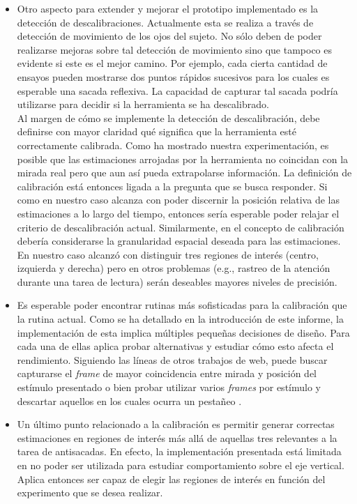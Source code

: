 \begin{itemize}
  \item Otro aspecto para extender y mejorar el prototipo implementado es la
detección de descalibraciones.
  Actualmente esta se realiza a través de detección de movimiento de los ojos
del sujeto.
  No sólo deben de poder realizarse mejoras sobre tal detección de movimiento
sino que tampoco es evidente si este es el mejor camino.
  Por ejemplo, cada cierta cantidad de ensayos pueden mostrarse dos puntos
rápidos sucesivos para los cuales es esperable una sacada reflexiva.
  La capacidad de capturar tal sacada podría utilizarse para decidir si la
herramienta se ha descalibrado. \\
  Al margen de cómo se implemente la detección de descalibración, debe
definirse con mayor claridad qué significa que la herramienta esté
correctamente calibrada.
  Como ha mostrado nuestra experimentación, es posible que las estimaciones
arrojadas por la herramienta no coincidan con la mirada real pero que aun así
pueda extrapolarse información.
  La definición de calibración está entonces ligada a la pregunta que se busca
responder.
  Si como en nuestro caso alcanza con poder discernir la posición relativa de
las estimaciones a lo largo del tiempo, entonces sería esperable poder relajar
el criterio de descalibración actual.
  Similarmente, en el concepto de calibración debería considerarse la
granularidad espacial deseada para las estimaciones.
  En nuestro caso alcanzó con distinguir tres regiones de interés (centro,
izquierda y derecha) pero en otros problemas (e.g., rastreo de la atención
durante una tarea de lectura) serán deseables mayores niveles de precisión.

  \item Es esperable poder encontrar rutinas más sofisticadas para la
calibración que la rutina actual.
  Como se ha detallado en la introducción de este informe, la implementación de
esta implica múltiples pequeñas decisiones de diseño.
  Para cada una de ellas aplica probar alternativas y estudiar cómo esto afecta
el rendimiento.
  Siguiendo las líneas de otros trabajos de \eyetracking web, puede buscar
capturarse el \textit{frame} de mayor coincidencia entre mirada y posición del
estímulo presentado \cite{huang_2016_pace} o bien probar utilizar varios
\textit{frames} por estímulo y descartar aquellos en los cuales ocurra un
pestañeo \cite{xu_2015_turker_gaze}. 

  \item Un último punto relacionado a la calibración es permitir generar
correctas estimaciones en regiones de interés más allá de aquellas tres
relevantes a la tarea de antisacadas.
  En efecto, la implementación presentada está limitada en no poder ser
utilizada para estudiar comportamiento sobre el eje vertical.
  Aplica entonces ser capaz de elegir las regiones de interés en función del
experimento que se desea realizar.


\end{itemize}
